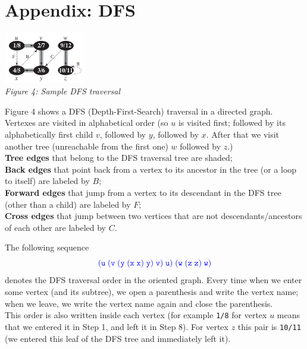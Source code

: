 \documentclass[jou]{apa6}
\begin{document}
\vspace{20pt}
\section{Appendix: DFS}

\begin{center}
\includegraphics[width=1.4in]{dfs-traversal.png}\\
{\em Figure 4: Sample DFS traversal}
\end{center}
Figure 4 shows a DFS (Depth-First-Search) traversal
in a directed graph. Vertexes are visited in alphabetical order 
(so $u$ is visited first; followed by its alphabetically first 
child $v$, followed by $y$, followed by $x$. After that
we visit another tree (unreachable from the first one) \textendash{}
$w$ followed by $z$.)\\
{\bf Tree edges} that belong to the DFS traversal tree are shaded;\\
{\bf Back edges} that point back from a vertex to its ancestor in the tree (or a loop to itself)
are labeled by $B$;\\
{\bf Forward edges} that jump from a vertex to its descendant in the DFS tree (other than a child) are
labeled by $F$;\\
{\bf Cross edges} that jump between two vertices that are not descendants/ancestors of 
each other are labeled by $C$.

The following sequence
\begin{equation} \label{eq1}
\textcolor{blue}{\mathtt{(u\;(v\;(y\;(x\;x)\;y)\;v)\;u)\;(w\;(z\;z)\;w)}}
\end{equation}
denotes the DFS traversal order in the oriented graph. 
Every time when we enter some vertex (and its subtree), 
we open a parenthesis and write the vertex name; when we leave, 
we write the vertex name again and close the parenthesis.\\
This order is also written inside each vertex (for example {\tt 1/8} 
for vertex $u$ means that we entered it in Step 1, and left it in 
Step 8). For vertex $z$ this pair is {\tt 10/11} (we entered this leaf
of the DFS tree and immediately left it).



\end{document}

